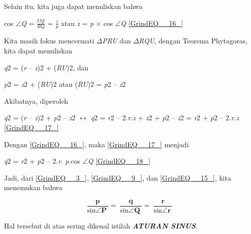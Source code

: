 \documentclass[11pt,fleqn]{book} %
\begin{document}
\begin{myEnumerate}
\begin{itemize}
\noindent 

\noindent Selain itu, kita juga dapat menuliskan bahwa

\noindent 

\noindent cos $\mathrm{\angle }$\textit{Q }= $\frac{UQ}{RQ}$ = $\frac{z}{p}$ atau \textit{z }= \textit{p }$\times$ cos $\mathrm{\angle }$\textit{Q       }\eqref{GrindEQ__16_}

\noindent 

\noindent \eject 

\noindent Kita masih fokus mencermati $\Delta$\textit{PRU }dan $\Delta$\textit{RQU}, dengan Teorema Phytagoras, kita dapat menuliskan

\noindent \textit{}

\noindent \textit{q}2 = (\textit{r }-- \textit{z})2 + (\textit{RU})2, dan

\noindent \textit{p}2 = \textit{z}2 + (\textit{RU})2 atau (\textit{RU})2 = \textit{p}2 -- \textit{z}2

\noindent 

\noindent Akibatnya, diperoleh

\noindent \textit{}

\noindent \textit{q}2 = (\textit{r }-- \textit{z})2 + \textit{p}2 -- \textit{z}2 $\mathrm{\leftrightarrow}$ \textit{q}2 = \textit{r}2 -- 2.\textit{r.z }+ \textit{z}2 + \textit{p}2 -- \textit{z}2 = \textit{r}2 + \textit{p}2 -- 2.\textit{r.z   }\eqref{GrindEQ__17_}

\noindent 

\noindent Dengan \eqref{GrindEQ__16_}, maka \eqref{GrindEQ__17_} menjadi

\noindent \textit{}

\noindent \textit{q}2 = \textit{r}2 + \textit{p}2 -- 2.\textit{r}. \textit{p}.cos $\mathrm{\angle }$\textit{Q         }\eqref{GrindEQ__18_}

\noindent 

\noindent Jadi, dari \eqref{GrindEQ__3_}, \eqref{GrindEQ__9_}, dan \eqref{GrindEQ__15_}, kita menemukan bahwa

\noindent 
\[\frac{\boldsymbol{p}}{{\boldsymbol{\mathrm{sin}} \boldsymbol{\mathrm{\angle }}\boldsymbol{P}\ }}\boldsymbol{=\ }\frac{\boldsymbol{q}}{{\boldsymbol{\mathrm{sin}} \boldsymbol{\mathrm{\angle }}\boldsymbol{Q}\ }}\boldsymbol{=\ }\frac{\boldsymbol{r}}{{\boldsymbol{\mathrm{sin}} \boldsymbol{\mathrm{\angle }}\boldsymbol{r}\ }}\] 


\noindent Hal tersebut di atas sering dikenal istilah \textbf{\textit{ATURAN SINUS}}.


\end{itemize}
\end{myEnumerate}
\end{document}
